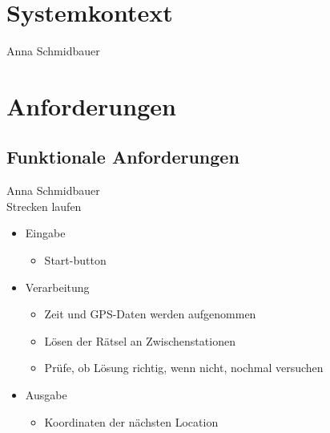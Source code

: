 \documentclass[a4paper, 12pt]{article}
\begin{document}
\newpage
\section{Systemkontext}Anna Schmidbauer\\

\begin{figure}[H] 
\centering

	
\end{figure}

\newpage
\section{Anforderungen}
\subsection{Funktionale Anforderungen}Anna Schmidbauer\\
{\Large Strecken laufen}\\
\begin{itemize}
\item Eingabe
	\begin{itemize}
	\item Start-button
	\end{itemize}
\item Verarbeitung
	\begin{itemize}
	\item Zeit und GPS-Daten werden aufgenommen
	\item Lösen der Rätsel an Zwischenstationen
	\item Prüfe, ob Lösung richtig, wenn nicht, nochmal versuchen
	\end{itemize}
\item Ausgabe
	\begin{itemize}
	\item Koordinaten der nächsten Location
	\end{itemize}
\end{itemize}
\end{document}
